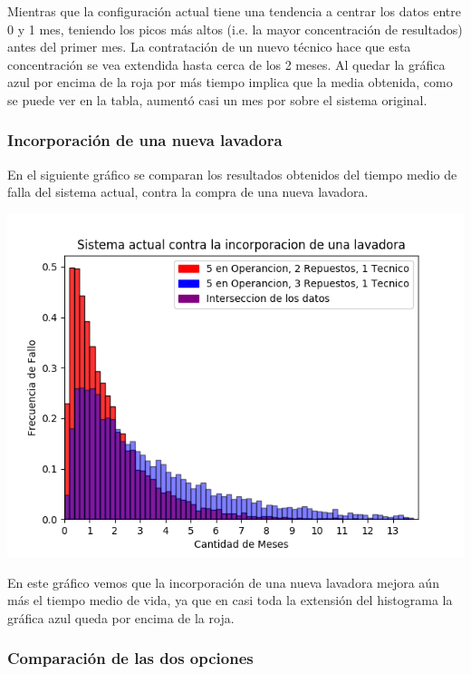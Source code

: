 \documentclass[11pt, spanish, a4paper]{article}
\begin{document}
Mientras que la configuraci\'on actual tiene una tendencia a centrar los datos entre 0 y 1 mes, teniendo los picos m\'as altos (i.e. la mayor concentraci\'on de resultados) antes del primer mes. La contrataci\'on de un nuevo t\'ecnico hace que esta concentraci\'on se vea extendida hasta cerca de los 2 meses.
Al quedar la gr\'afica azul por encima de la roja por m\'as tiempo implica que la media obtenida, como se puede ver en la tabla, aument\'o casi un mes por sobre el sistema original. \\

\smallbreak
\subsubsection{Incorporaci\'on de una nueva lavadora}
En el siguiente gr\'afico se comparan los resultados obtenidos del tiempo medio de falla del sistema actual, contra la compra de una nueva lavadora. 

\includegraphics{Figure_2}

En este gr\'afico vemos que la incorporaci\'on de una nueva lavadora mejora a\'un m\'as el tiempo medio de vida, ya que en casi toda la extensi\'on del histograma la gr\'afica azul queda por encima de la roja.


\smallbreak
\subsubsection{Comparaci\'on de las dos opciones}
\end{document}
